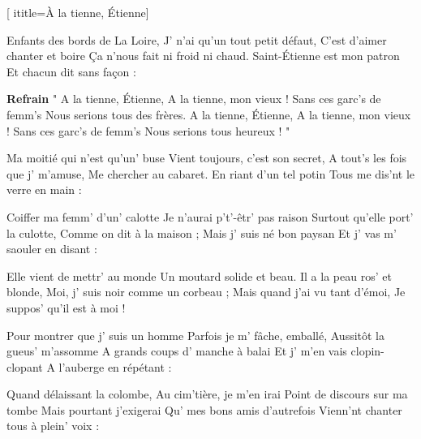 [
  ititle={À la tienne, Étienne}]

\beginverse
Enfants des bords de La Loire,
J' n'ai qu'un tout petit défaut,
C'est d'aimer chanter et boire
Ça n'nous fait ni froid ni chaud.
Saint-Étienne est mon patron
Et chacun dit sans façon :
\endverse

\beginchorus
\textbf{Refrain}
" A la tienne, Étienne,
A la tienne, mon vieux !
Sans ces garc's de femm's
Nous serions tous des frères.
A la tienne, Étienne,
A la tienne, mon vieux !
Sans ces garc's de femm's
Nous serions tous heureux ! "
\endchorus

\beginverse
Ma moitié qui n'est qu'un' buse
Vient toujours, c'est son secret,
A tout's les fois que j' m'amuse,
Me chercher au cabaret.
En riant d'un tel potin
Tous me dis'nt le verre en main :
\endverse

\beginverse
Coiffer ma femm' d'un' calotte
Je n'aurai p't'-êtr' pas raison
Surtout qu'elle port' la culotte,
Comme on dit à la maison ;
Mais j' suis né bon paysan
Et j' vas m' saouler en disant :
\endverse

\beginverse
Elle vient de mettr' au monde
Un moutard solide et beau.
Il a la peau ros' et blonde,
Moi, j' suis noir comme un corbeau ;
Mais quand j'ai vu tant d'émoi,
Je suppos' qu'il est à moi !
\endverse

\beginverse
Pour montrer que j' suis un homme
Parfois je m' fâche, emballé,
Aussitôt la gueus' m'assomme
A grands coups d' manche à balai
Et j' m'en vais clopin-clopant
A l'auberge en répétant :
\endverse

\beginverse
Quand délaissant la colombe,
Au cim'tière, je m'en irai
Point de discours sur ma tombe
Mais pourtant j'exigerai
Qu' mes bons amis d'autrefois
Vienn'nt chanter tous à plein' voix :
\endverse

\endsong
